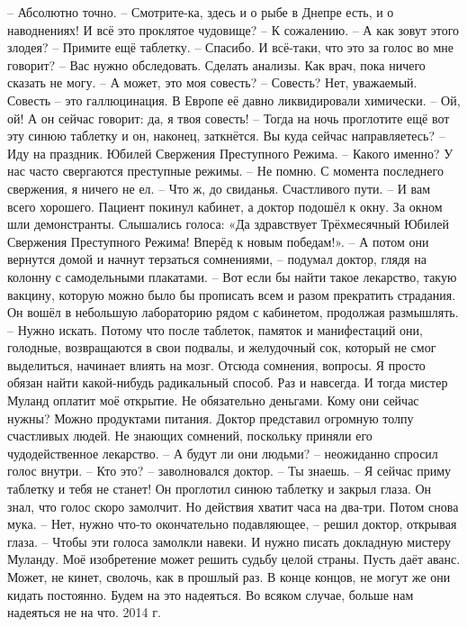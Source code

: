 – Абсолютно точно.
– Смотрите-ка, здесь и о рыбе в Днепре есть, и о наводнениях! И всё это проклятое чудовище?
– К сожалению.
– А как зовут этого злодея?
– Примите ещё таблетку.
– Спасибо. И всё-таки, что это за голос во мне говорит?
– Вас нужно обследовать. Сделать анализы. Как врач, пока ничего сказать не могу.
– А может, это моя совесть?
– Совесть? Нет, уважаемый. Совесть – это галлюцинация. В Европе её давно ликвидировали химически.
– Ой, ой! А он сейчас говорит: да, я твоя совесть!
– Тогда на ночь проглотите ещё вот эту синюю таблетку и он, наконец, заткнётся. Вы куда сейчас направляетесь?
– Иду на праздник. Юбилей Свержения Преступного Режима.
– Какого именно? У нас часто свергаются преступные режимы.
– Не помню. С момента последнего свержения, я ничего не ел.
– Что ж, до свиданья. Счастливого пути.
– И вам всего хорошего.
  Пациент покинул кабинет, а доктор подошёл к окну. За окном шли демонстранты. Слышались голоса: «Да здравствует Трёхмесячный Юбилей Свержения Преступного Режима! Вперёд к новым победам!».
– А потом они вернутся домой и начнут терзаться сомнениями, – подумал доктор, глядя на колонну с самодельными плакатами. – Вот если бы найти такое лекарство, такую вакцину, которую можно было бы прописать всем и разом прекратить страдания.
  Он вошёл в небольшую лабораторию рядом с кабинетом, продолжая размышлять.
– Нужно искать. Потому что после таблеток, памяток и манифестаций они, голодные, возвращаются в свои подвалы, и желудочный сок, который не смог выделиться, начинает влиять на мозг. Отсюда сомнения, вопросы. Я просто обязан найти какой-нибудь радикальный способ. Раз и навсегда. И тогда мистер Муланд оплатит моё открытие. Не обязательно деньгами. Кому они сейчас нужны? Можно продуктами питания.
Доктор представил огромную толпу счастливых людей. Не знающих сомнений, поскольку приняли его чудодейственное лекарство.
– А будут ли они людьми? – неожиданно спросил голос внутри.
– Кто это? – заволновался доктор.
– Ты знаешь.
– Я сейчас приму таблетку и тебя не станет!
  Он проглотил синюю таблетку и закрыл глаза. Он знал, что голос скоро замолчит. Но действия хватит часа на два-три. Потом снова мука.
– Нет, нужно что-то окончательно подавляющее, – решил доктор, открывая глаза. – Чтобы эти голоса замолкли навеки. И нужно писать докладную мистеру Муланду. Моё изобретение может решить судьбу целой страны. Пусть даёт аванс. Может, не кинет, сволочь, как в прошлый раз. В конце концов, не могут же они кидать постоянно. Будем на это надеяться. Во всяком случае, больше нам надеяться не на что.
2014 г.
\restorecr

